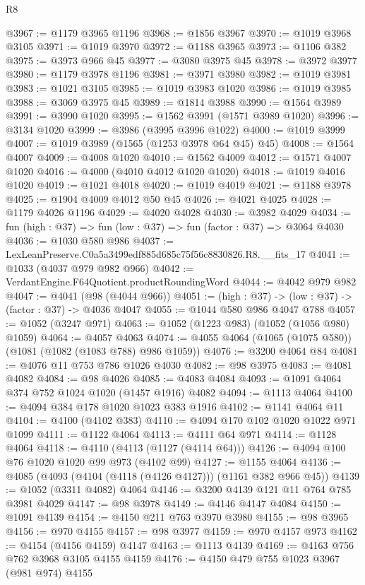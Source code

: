 \begin{lexlean}{R8}
\begin{coremodule}
@3967 := @1179 @3965 @1196
@3968 := @1856 @3967
@3970 := @1019 @3968 @3105
@3971 := @1019 @3970
@3972 := @1188 @3965
@3973 := @1106 @382
@3975 := @3973 @966 @45
@3977 := @3080 @3975 @45
@3978 := @3972 @3977
@3980 := @1179 @3978 @1196
@3981 := @3971 @3980
@3982 := @1019 @3981
@3983 := @1021 @3105
@3985 := @1019 @3983 @1020
@3986 := @1019 @3985
@3988 := @3069 @3975 @45
@3989 := @1814 @3988
@3990 := @1564 @3989
@3991 := @3990 @1020
@3995 := @1562 @3991 (@1571 @3989 @1020)
@3996 := @3134 @1020
@3999 := @3986 (@3995 @3996 @1022)
@4000 := @1019 @3999
@4007 := @1019 @3989 (@1565 (@1253 @3978 @64 @45) @45)
@4008 := @1564 @4007
@4009 := @4008 @1020
@4010 := @1562 @4009
@4012 := @1571 @4007 @1020
@4016 := @4000 (@4010 @4012 @1020 @1020)
@4018 := @1019 @4016 @1020
@4019 := @1021 @4018
@4020 := @1019 @4019
@4021 := @1188 @3978
@4025 := @1904 @4009 @4012 @50 @45
@4026 := @4021 @4025
@4028 := @1179 @4026 @1196
@4029 := @4020 @4028
@4030 := @3982 @4029
@4034 := fun (high : @37) => fun (low : @37) => fun (factor : @37) => @3064 @4030
@4036 := @1030 @580 @986
@4037 := LexLeanPreserve.C0a5a3499edf885d685c75f56c8830826.R8.__fits_17
@4041 := @1033 (@4037 @979 @982 @966)
@4042 := VerdantEngine.F64Quotient.productRoundingWord
@4044 := @4042 @979 @982
@4047 := @4041 (@98 (@4044 @966))
@4051 := (high : @37) -> (low : @37) -> (factor : @37) -> @4036 @4047
@4055 := @1044 @580 @986 @4047 @788
@4057 := @1052 (@3247 @971)
@4063 := @1052 (@1223 @983) (@1052 (@1056 @980) @1059)
@4064 := @4057 @4063
@4074 := @4055 @4064 (@1065 (@1075 @580)) (@1081 (@1082 (@1083 @788) @986 @1059))
@4076 := @3200 @4064 @84
@4081 := @4076 @11 @753 @786 @1026 @4030
@4082 := @98 @3975
@4083 := @4081 @4082
@4084 := @98 @4026
@4085 := @4083 @4084
@4093 := @1091 @4064 @374 @752 @1024 @1020 (@1457 @1916) @4082
@4094 := @1113 @4064
@4100 := @4094 @384 @178 @1020 @1023 @383 @1916
@4102 := @1141 @4064 @11
@4104 := @4100 (@4102 @383)
@4110 := @4094 @170 @102 @1020 @1022 @971 @1099
@4111 := @1122 @4064
@4113 := @4111 @64 @971
@4114 := @1128 @4064
@4118 := @4110 (@4113 (@1127 (@4114 @64)))
@4126 := @4094 @100 @76 @1020 @1020 @99 @973 (@4102 @99)
@4127 := @1155 @4064
@4136 := @4085 (@4093 (@4104 (@4118 (@4126 @4127))) (@1161 @382 @966 @45))
@4139 := @1052 (@3311 @4082) @4064
@4146 := @3200 @4139 @121 @11 @764 @785 @3981 @4029
@4147 := @98 @3978
@4149 := @4146 @4147 @4084
@4150 := @1091 @4139
@4154 := @4150 @211 @763 @3970 @3980
@4155 := @98 @3965
@4156 := @970 @4155
@4157 := @98 @3977
@4159 := @970 @4157 @973
@4162 := @4154 (@4156 @4159) @4147
@4163 := @1113 @4139
@4169 := @4163 @756 @762 @3968 @3105 @4155 @4159
@4176 := @4150 @479 @755 @1023 @3967 (@981 @974) @4155

\end{coremodule}
\end{lexlean}
